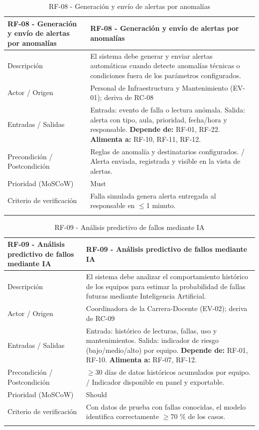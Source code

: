 \begingroup
\small
\begin{longtable}{|P{0.5000}|P{0.5000}|}
\hline
RF-08 - Generación y envío de alertas por anomalías & RF-08 - Generación y envío de alertas por anomalías \\ \hline
Descripción & El sistema debe generar y enviar alertas automáticas cuando detecte anomalías técnicas o condiciones fuera de los parámetros configurados. \\ \hline
Actor / Origen & Personal de Infraestructura y Mantenimiento (EV-01); deriva de RC-08 \\ \hline
Entradas / Salidas & Entrada: evento de falla o lectura anómala. Salida: alerta con tipo, aula, prioridad, fecha/hora y responsable. \textbf{Depende de:} RF-01, RF-22. \textbf{Alimenta a:} RF-10, RF-11, RF-12. \\ \hline
Precondición / Postcondición & Reglas de anomalía y destinatarios configurados. / Alerta enviada, registrada y visible en la vista de alertas. \\ \hline
Prioridad (MoSCoW) & Must \\ \hline
Criterio de verificación & Falla simulada genera alerta entregada al responsable en $\leq$1 minuto. \\ \hline
\caption{RF-08 - Generación y envío de alertas por anomalías}
\end{longtable}
\endgroup

\begingroup
\small
\begin{longtable}{|P{0.5000}|P{0.5000}|}
\hline
RF-09 - Análisis predictivo de fallos mediante IA & RF-09 - Análisis predictivo de fallos mediante IA \\ \hline
Descripción & El sistema debe analizar el comportamiento histórico de los equipos para estimar la probabilidad de fallas futuras mediante Inteligencia Artificial. \\ \hline
Actor / Origen & Coordinadora de la Carrera-Docente (EV-02); deriva de RC-09 \\ \hline
Entradas / Salidas & Entrada: histórico de lecturas, fallas, uso y mantenimientos. Salida: indicador de riesgo (bajo/medio/alto) por equipo. \textbf{Depende de:} RF-01, RF-10. \textbf{Alimenta a:} RF-07, RF-12. \\ \hline
Precondición / Postcondición & $\geq$30 días de datos históricos acumulados por equipo. / Indicador disponible en panel y exportable. \\ \hline
Prioridad (MoSCoW) & Should \\ \hline
Criterio de verificación & Con datos de prueba con fallas conocidas, el modelo identifica correctamente $\geq$70 \% de los casos. \\ \hline
\caption{RF-09 - Análisis predictivo de fallos mediante IA}
\end{longtable}
\endgroup

